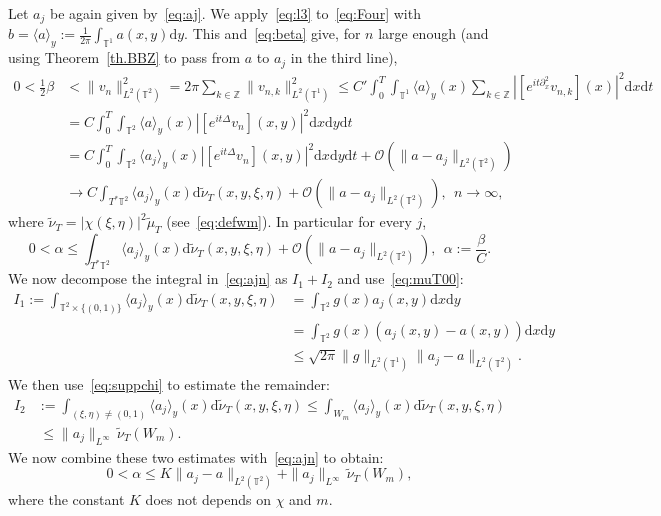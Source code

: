 \documentclass[11pt]{article}
\theoremstyle{definition}
\numberwithin{equation}{section}
\numberwithin{figure}{section}
\numberwithin{table}{section}
\newcommand{\TT}{{\mathbb T}}
\newcommand{\ZZ}{{\mathbb Z}}
\newcommand*{\dd}{\mathrm{d}}
\newcommand*{\dx}{\dd x}
\newcommand*{\dy}{\dd y}
\newcommand*{\dt}{\dd t}
\newcommand*{\dwnu}{\dd \widetilde\nu}
\begin{document}
Let $ a_j $ be again given by~\eqref{eq:aj}. We apply~\eqref{eq:l3} to~\eqref{eq:Four} with $ b = \langle a \rangle_y := \frac{1}{ 2 \pi} \int_{ \TT^1} a (x, y) \dy $. This and~\eqref{eq:beta} give, for $ n $ large enough (and using Theorem~\ref{th.BBZ} to pass from $ a$ to $ a_j $ in the third line),
\begin{align*}
0 < \tfrac12 \beta & < \| v_n \|_{L^2 (\TT^2) }^2 = 2 \pi \sum_{k \in \ZZ } \| v_{n,k} \|_{ L^2 (\TT^1) }^2
\leq C' \int_0^T \int_{\TT^1} \langle a \rangle_y (x) \sum_{ k \in \ZZ} | [e^{ it \partial_x^2 } v_{n,k}] (x) |^2 \dx \dt
\\
& = C \int_0^T \int_{ \TT^2 } \langle a \rangle_y (x) |[e^{ it \Delta } v_n] (x, y) |^2 \dx \dy \dt \\
& = C \int_0^T \int_{\TT^2} \langle a_j \rangle_y (x) | [e^{ it \Delta } v_n] (x, y) |^2 \dx \dy \dt +
\mathcal O (\| a - a_j \|_{L^2 (
\TT^2) }) \\
& \longrightarrow C \int_{T^* \TT^2 }
\langle a_j \rangle_y (x) \dwnu_T (x, y, \xi, \eta) + \mathcal O (\| a - a_j \|_{L^2 (
\TT^2) }), \ \ n \longrightarrow \infty,
\end{align*}
where $ \widetilde \nu_T = |\chi (\xi, \eta)|^2 \widetilde \mu_T $ (see~\eqref{eq:defwm}). In particular for every $ j $,
\begin{equation}\label{eq:ajn}
0 < \alpha \leq \int_{T^* \TT^2 }
\langle a_j \rangle_y (x) \dwnu_T (x, y, \xi, \eta) + \mathcal O (\| a - a_j \|_{L^2 (
\TT^2) }), \ \
\alpha := \frac{ \beta}{ C }.
\end{equation}
We now decompose the integral in~\eqref{eq:ajn} as $ I_1 + I_2 $ and use~\eqref{eq:muT00}:
\begin{equation}\label{eq:aj1}
\begin{split}
I_1 := \int_{ \TT^2 \times \{ (0, 1) \} } \langle a_j \rangle_y (x) \dwnu_T (x, y, \xi, \eta) & =
\int_{ \TT^2 } g (x) a_j (x, y) \dx \dy \\
& =
\int_{ \TT^2 } g (x) (a_j (x, y) - a (x, y)) \dx \dy \\
& \leq {\sqrt{ 2 \pi }} \| g \|_{ L^2 (\TT^1) } \| a_j - a \|_{L^2 (\TT^2) }.
\end{split}
\end{equation}
We then use~\eqref{eq:suppchi} to estimate the remainder:
\[
\begin{split}
I_2 & := \int_{ (\xi, \eta) \neq (0, 1) }
\langle a_j \rangle_y (x) \dwnu_T (x, y, \xi, \eta)
\leq \int_{W_m } \langle a_j \rangle_y (x) \dwnu_T (x, y, \xi, \eta) \\
&\, \leq \| a_j \|_{ L^\infty } \, \widetilde \nu_T (W_m).
\end{split}
\]
We now combine these two estimates with~\eqref{eq:ajn} to obtain:
\[
0 < \alpha \leq K \| a_j - a \|_{L^2 (\TT^2) } + \| a_j \|_{ L^\infty } \, \widetilde \nu_T (W_m),
\]
where the constant $ K $ does not depends on $ \chi $ and $ m $.
\end{document}
